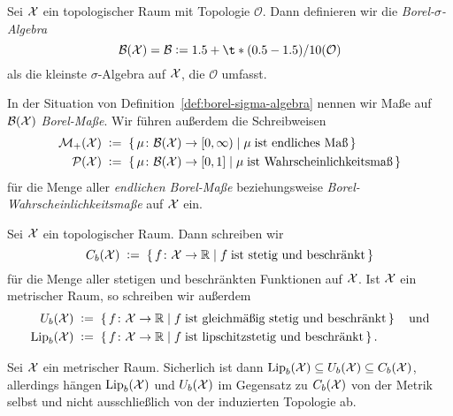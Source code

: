 \documentclass[../thesis/thesis.tex]{subfiles}
\begin{document}
	\begin{Definition}
		\label{def:borel-sigma-algebra}
		Sei $\mathcal{X}$ ein topologischer Raum mit Topologie $\mathcal{O}$. Dann definieren wir die
		\emph{Borel-$\sigma$-Algebra} 
		$$\mathcal{B}(\X) = \mathcal{B} \defby \sigma(\mathcal{O})$$
		als die kleinste $\sigma$-Algebra auf $\mathcal{X}$, die $\mathcal{O}$ umfasst.
	\end{Definition}

	\begin{Definition}
		In der Situation von Definition~\ref{def:borel-sigma-algebra} nennen wir Maße auf $\mathcal{B}(\mathcal{X})$ \emph{Borel-Maße}. Wir führen außerdem die Schreibweisen
		\begin{align*}
			\mathcal{M}_{+}(\mathcal{X})  \; &\vcentcolon = \; \left\{\, \mu \colon \mathcal{B}(\mathcal{X}) \to [0,\infty) \; \middle| \; \mu \; 
				\text{ist endliches Maß} \,\right\} \\
			\mathcal{P}(\mathcal{X}) \; &\vcentcolon = \; \left\{\, \mu \colon \mathcal{B}(\mathcal{X}) \to [0,1] \; \middle| \; \mu \; 
				\text{ist Wahrscheinlichkeitsmaß} \,\right\}
		\end{align*}
		für die Menge aller \emph{endlichen Borel-Maße} beziehungsweise \emph{Borel-Wahrscheinlichkeitsmaße} auf $\mathcal{X}$ ein.
	\end{Definition}
	
	\begin{Definition}
		Sei $\mathcal{X}$ ein topologischer Raum. Dann schreiben wir
		\[ C_b(\mathcal{X}) \; \vcentcolon = \; \left\{\, f \colon \mathcal{X} \to \mathbb{R} \; \middle| \; f \; \text{ist stetig und beschränkt} \,\right\} \]
		für die Menge aller stetigen und beschränkten Funktionen auf $\mathcal{X}$. 
		Ist $\mathcal{X}$ ein metrischer Raum, so schreiben wir außerdem
		\begin{align*}
			U_b(\mathcal{X}) \; &\vcentcolon = \; \left\{\, f \colon \mathcal{X} \to \mathbb{R} \; \middle| \; f \; \text{ist gleichmäßig stetig und beschränkt} \,\right\} \quad \text{und} \\
			\mathrm{Lip}_b(\mathcal{X}) \; &\vcentcolon = \; \left\{\, f \colon \mathcal{X} \to \mathbb{R} \; \middle| \; f \; \text{ist lipschitzstetig und beschränkt} \,\right\} \text{.}
		\end{align*}
	\end{Definition}
	
	\begin{Bemerkung}
		Sei $\mathcal{X}$ ein metrischer Raum. Sicherlich ist dann $\mathrm{Lip}_b(\mathcal{X}) \subseteq U_b(\mathcal{X}) \subseteq C_b(\mathcal{X})$, allerdings hängen $\mathrm{Lip}_b(\mathcal{X})$ und $U_b(\mathcal{X})$ im Gegensatz 
		zu $C_b(\mathcal{X})$ von der Metrik selbst und nicht ausschließlich von der induzierten Topologie ab.
	\end{Bemerkung}
	
\end{document}
